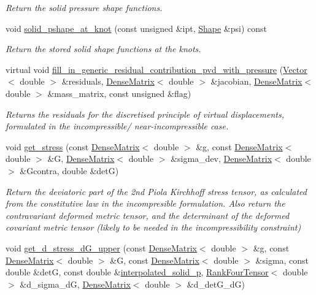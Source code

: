 \begin{DoxyCompactItemize}
\begin{DoxyCompactList}\small\item\em Return the solid pressure shape functions. \end{DoxyCompactList}\item 
void \hyperlink{classoomph_1_1PVDEquationsWithPressure_a73c998eb5cab4d5fe980006115b2aeab}{solid\+\_\+pshape\+\_\+at\+\_\+knot} (const unsigned \&ipt, \hyperlink{classoomph_1_1Shape}{Shape} \&psi) const
\begin{DoxyCompactList}\small\item\em Return the stored solid shape functions at the knots. \end{DoxyCompactList}\item 
virtual void \hyperlink{classoomph_1_1PVDEquationsWithPressure_a59c8c6164edf79148deb8dbeab79376d}{fill\+\_\+in\+\_\+generic\+\_\+residual\+\_\+contribution\+\_\+pvd\+\_\+with\+\_\+pressure} (\hyperlink{classoomph_1_1Vector}{Vector}$<$ double $>$ \&residuals, \hyperlink{classoomph_1_1DenseMatrix}{Dense\+Matrix}$<$ double $>$ \&jacobian, \hyperlink{classoomph_1_1DenseMatrix}{Dense\+Matrix}$<$ double $>$ \&mass\+\_\+matrix, const unsigned \&flag)
\begin{DoxyCompactList}\small\item\em Returns the residuals for the discretised principle of virtual displacements, formulated in the incompressible/ near-\/incompressible case. \end{DoxyCompactList}\item 
void \hyperlink{classoomph_1_1PVDEquationsWithPressure_a2fb01dcbdef6214a04b89485c9142dc8}{get\+\_\+stress} (const \hyperlink{classoomph_1_1DenseMatrix}{Dense\+Matrix}$<$ double $>$ \&g, const \hyperlink{classoomph_1_1DenseMatrix}{Dense\+Matrix}$<$ double $>$ \&G, \hyperlink{classoomph_1_1DenseMatrix}{Dense\+Matrix}$<$ double $>$ \&sigma\+\_\+dev, \hyperlink{classoomph_1_1DenseMatrix}{Dense\+Matrix}$<$ double $>$ \&Gcontra, double \&detG)
\begin{DoxyCompactList}\small\item\em Return the deviatoric part of the 2nd Piola Kirchhoff stress tensor, as calculated from the constitutive law in the incompresible formulation. Also return the contravariant deformed metric tensor, and the determinant of the deformed covariant metric tensor (likely to be needed in the incompressibility constraint) \end{DoxyCompactList}\item 
void \hyperlink{classoomph_1_1PVDEquationsWithPressure_a5b2bc099a877ef18bf641480fdf67262}{get\+\_\+d\+\_\+stress\+\_\+d\+G\+\_\+upper} (const \hyperlink{classoomph_1_1DenseMatrix}{Dense\+Matrix}$<$ double $>$ \&g, const \hyperlink{classoomph_1_1DenseMatrix}{Dense\+Matrix}$<$ double $>$ \&G, const \hyperlink{classoomph_1_1DenseMatrix}{Dense\+Matrix}$<$ double $>$ \&sigma, const double \&detG, const double \&\hyperlink{classoomph_1_1PVDEquationsWithPressure_a9d8ecc731f98d8d4aae18b55f835bc61}{interpolated\+\_\+solid\+\_\+p}, \hyperlink{classoomph_1_1RankFourTensor}{Rank\+Four\+Tensor}$<$ double $>$ \&d\+\_\+sigma\+\_\+dG, \hyperlink{classoomph_1_1DenseMatrix}{Dense\+Matrix}$<$ double $>$ \&d\+\_\+det\+G\+\_\+dG)

\end{DoxyCompactItemize}
